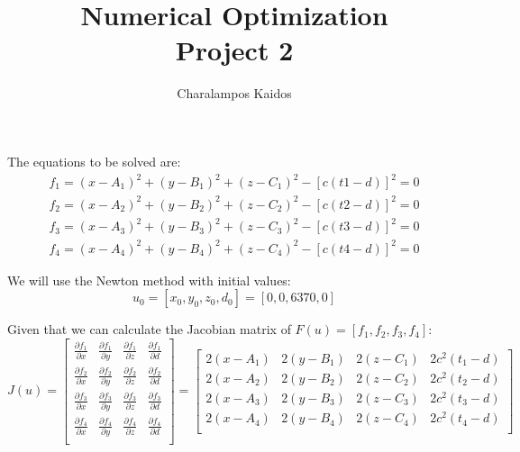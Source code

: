 \documentclass[a4paper]{article}
\begin{document}
\title{Numerical Optimization\\Project 2}
\author{Charalampos Kaidos}

\maketitle

\section{}

The equations to be solved are:
\begin{align}
f_1 = (x - A_1)^2 + (y - B_1)^2 + (z - C_1)^2 - [c(t1 - d)]^2 =0 \nonumber\\
f_2 = (x - A_2)^2 + (y - B_2)^2 + (z - C_2)^2 - [c(t2 - d)]^2 =0 \nonumber\\
f_3 = (x - A_3)^2 + (y - B_3)^2 + (z - C_3)^2 - [c(t3 - d)]^2 =0 \nonumber\\
f_4 = (x - A_4)^2 + (y - B_4)^2 + (z - C_4)^2 - [c(t4 - d)]^2 =0 \nonumber
\end{align}

We will use the Newton method with initial values:
$$
u_0 = [x_0, y_0, z_0, d_0] = [0, 0, 6370, 0]
$$

Given that we can calculate the Jacobian matrix of $F(u)=[f_1, f_2,f_3, f_4]$:
$$
J(u) =
\begin{bmatrix}
	\frac{\partial{f_1}}{\partial{x}} & \frac{\partial{f_1}}{\partial{y}} &
	\frac{\partial{f_1}}{\partial{z}} & \frac{\partial{f_1}}{\partial{d}} \\
	\frac{\partial{f_2}}{\partial{x}} & \frac{\partial{f_2}}{\partial{y}} &
	\frac{\partial{f_2}}{\partial{z}} & \frac{\partial{f_2}}{\partial{d}} \\
	\frac{\partial{f_3}}{\partial{x}} & \frac{\partial{f_3}}{\partial{y}} &
	\frac{\partial{f_3}}{\partial{z}} & \frac{\partial{f_3}}{\partial{d}} \\
	\frac{\partial{f_4}}{\partial{x}} & \frac{\partial{f_4}}{\partial{y}} &
	\frac{\partial{f_4}}{\partial{z}} & \frac{\partial{f_4}}{\partial{d}} \\
\end{bmatrix}
=
\begin{bmatrix}
	2(x-A_1) & 2(y-B_1) & 2(z-C_1) & 2c^2(t_1-d) \\
	2(x-A_2) & 2(y-B_2) & 2(z-C_2) & 2c^2(t_2-d) \\
	2(x-A_3) & 2(y-B_3) & 2(z-C_3) & 2c^2(t_3-d) \\
	2(x-A_4) & 2(y-B_4) & 2(z-C_4) & 2c^2(t_4-d) \\
\end{bmatrix}
$$
\end{document}

